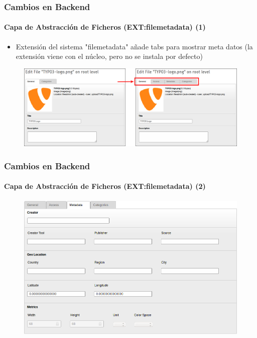 
\begin{frame}[fragile]
	\frametitle{Cambios en Backend}
	\framesubtitle{Capa de Abstracción de Ficheros (EXT:filemetadata) (1)}

	\begin{itemize}
		\item Extensión del sistema "filemetadata" añade tabs para mostrar meta datos\newline
			\small(la extensión viene con el núcleo, pero no se instala por defecto)\normalsize
	\end{itemize}

	\begin{figure}
		\includegraphics[width=0.95\linewidth]{Images/BackendChanges/FileMetaDataTabs.png}
	\end{figure}
\end{frame}


\begin{frame}[fragile]
	\frametitle{Cambios en Backend}
    	\framesubtitle{Capa de Abstracción de Ficheros (EXT:filemetadata) (2)}

	\begin{figure}
		\includegraphics[width=0.8\linewidth]{Images/BackendChanges/FileMetaData.png}
	\end{figure}

\end{frame}

